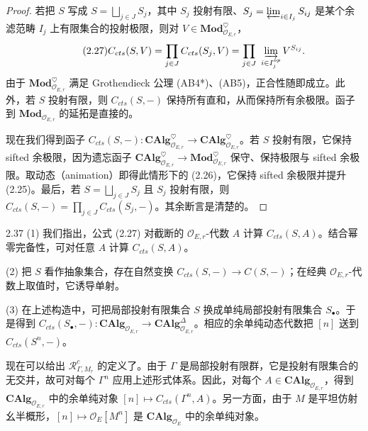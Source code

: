 \begin{proof}
若把 $S$ 写成 $S = \bigsqcup_{j\in J}S_j$，其中 $S_j$ 投射有限、$S_j = \varprojlim_{i\in I_j}S_{ij}$ 是某个余滤范畴 $I_j$ 上有限集合的投射极限，则对 $V \in \mathbf{Mod}^\heartsuit_{\mathcal O_{E,r}}$，
\begin{equation}
\tag{2.27}
C_{cts}(S,V) = \prod_{j\in J}C_{cts}(S_j,V) = \prod_{j\in J}\ \varinjlim_{i\in I_j^{op}}V^{S_{ij}} .
\end{equation}
由于 $\mathbf{Mod}^\heartsuit_{\mathcal O_{E,r}}$ 满足 Grothendieck 公理 (AB4*)、(AB5)，正合性随即成立。此外，若 $S$ 投射有限，则 $C_{cts}(S,-)$ 保持所有直和，从而保持所有余极限。函子到 $\mathbf{Mod}_{\mathcal O_{E,r}}$ 的延拓是直接的。

现在我们得到函子 $C_{cts}(S,-)\colon \mathbf{CAlg}^\heartsuit_{\mathcal O_{E,r}} \to \mathbf{CAlg}^\heartsuit_{\mathcal O_{E,r}}$。若 $S$ 投射有限，它保持 sifted 余极限，因为遗忘函子 $\mathbf{CAlg}^\heartsuit_{\mathcal O_{E,r}} \to \mathbf{Mod}^\heartsuit_{\mathcal O_{E,r}}$ 保守、保持极限与 sifted 余极限。取动态（animation）即得此情形下的 (2.26)，它保持 sifted 余极限并提升 (2.25)。最后，若 $S = \bigsqcup_{j\in J}S_j$ 且 $S_j$ 投射有限，则 $C_{cts}(S,-) = \prod_{j\in J}C_{cts}(S_j,-)$。其余断言是清楚的。
\end{proof}

\begin{rem}{2.37}
(1) 我们指出，公式 (2.27) 对截断的 $\mathcal O_{E,r}$-代数 $A$ 计算 $C_{cts}(S,A)$。结合幂零完备性，可对任意 $A$ 计算 $C_{cts}(S,A)$。

(2) 把 $S$ 看作抽象集合，存在自然变换 $C_{cts}(S,-) \to C(S,-)$；在经典 $\mathcal O_{E,r}$-代数上取值时，它诱导单射。

(3) 在上述构造中，可把局部投射有限集合 $S$ 换成单纯局部投射有限集合 $S_\bullet$。于是得到 $C_{cts}(S_\bullet,-)\colon \mathbf{CAlg}_{\mathcal O_{E,r}} \to \mathbf{CAlg}^\Delta_{\mathcal O_{E,r}}$。相应的余单纯动态代数把 $[n]$ 送到 $C_{cts}(S^n,-)$。
\label{rem:zhu2-2-37}
\end{rem}

现在可以给出 $\mathcal R^c_{\Gamma,M_r}$ 的定义了。由于 $\Gamma$ 是局部投射有限群，它是投射有限集合的无交并，故可对每个 $\Gamma^n$ 应用上述形式体系。因此，对每个 $A \in \mathbf{CAlg}_{\mathcal O_{E,r}}$，得到 $\mathbf{CAlg}_{\mathcal O_{E,r}}$ 中的余单纯对象 $[n] \mapsto C_{cts}(\Gamma^n,A)$。另一方面，由于 $M$ 是平坦仿射幺半概形，$[n] \mapsto \mathcal O_E[M^n]$ 是 $\mathbf{CAlg}_{\mathcal O_E}$ 中的余单纯对象。

